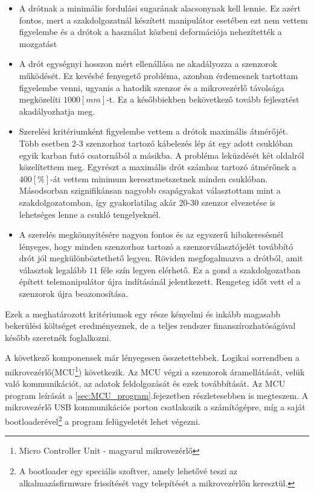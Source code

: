 \begin{itemize}
  \item A drótnak a minimális fordulási sugarának alacsonynak kell lennie. Ez azért fontos, mert a szakdolgozatnál készített manipulátor esetében ezt nem vettem figyelembe és a drótok a használat közbeni deformációja nehezítették a mozgatást
  \item A drót egységnyi hosszon mért ellenállása ne akadályozza a szenzorok működését. Ez kevésbé fenyegető probléma, azonban érdemesnek tartottam figyelembe venni, ugyanis a hatodik szenzor és a mikrovezérlő távolsága megközelíti $1000[mm]$-t. Ez a későbbiekben bekövetkező tovább fejlesztést akadályozhatja meg.
  \item Szerelési kritériumként figyelembe vettem a drótok maximális átmérőjét. Több esetben 2-3 szenzorhoz tartozó kábelezés lép át egy adott csuklóban egyik karban futó csatornából a másikba. A probléma leküzdését két oldalról közelítettem meg. Egyrészt a maximális drót számhoz tartozó átmérőnek a $400[\%]$-át vettem minimum keresztmetszetnek minden csuklóban. Másodsorban szignifikánsan nagyobb csapágyakat választottam mint a szakdolgozatomban, így gyakorlatilag akár 20-30 szenzor elvezetése is lehetséges lenne a csukló tengelyeknél.
  \item A szerelés megkönnyítésére nagyon fontos és az egyszerű hibakeresésnél lényeges, hogy minden szenzorhoz tartozó a szenzorválasztójelét továbbító drót jól megkülönböztethető legyen. Röviden megfogalmazva a drótból, amit választok legalább $11$ féle szín legyen elérhető. Ez a gond a szakdolgozatban épített telemanipulátor újra indításánál jelentkezett. Rengeteg időt vett el a szenzorok újra beazonosítása.
\end{itemize}

Ezek a meghatározott kritériumok egy része kényelmi és inkább magasabb bekerülési költséget eredményeznek, de a teljes rendszer finanszírozhatóságával később szeretnék foglalkozni.

A következő komponensek már lényegesen összetettebbek. Logikai sorrendben a mikrovezérlő(MCU\footnote{Micro Controller Unit - magyarul mikrovezérlő}) következik. Az MCU végzi a szenzorok áramellátását, velük való kommunikációt, az adatok feldolgozását és ezek továbbítását. Az MCU program leírását a \ref{sec:MCU_program}.fejezetben részletesebben is megteszem. A mikrovezérlő USB kommunikációs porton csatlakozik a számítógépre, míg a saját bootloaderével\footnote{A bootloader egy speciális szoftver, amely lehetővé teszi az alkalmazásfirmware frissítését vagy telepítését a mikrovezérlőn keresztül.} a program felügyeletét lehet végezni.

